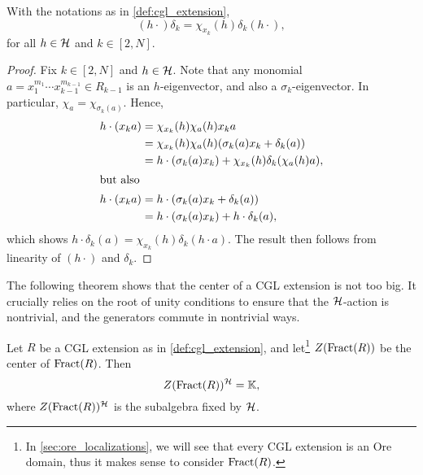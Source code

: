 \begin{lemma}\label{lem:h_after_delta}
	With the notations as in \cref{def:cgl_extension},
	\begin{equation*}
		(h\cdot )\delta_k = \chi_{x_k}(h)\delta_k(h\cdot),
	\end{equation*}
	for all $h \in \mathcal{H}$ and $k \in [2, N]$.
\end{lemma}
\begin{proof}
	Fix $k \in [2, N]$ and $h \in \mathcal{H}$. Note that any monomial $a = x_1^{m_1}\cdots x_{k-1}^{m_{k-1}} \in R_{k-1}$ is an $h$-eigenvector, and also a $\sigma_k$-eigenvector. In particular, $\chi_a = \chi_{\sigma_k(a)}$. Hence,
	\begin{align*}
		h \cdot(x_k a)  & = \chi_{x_k}(h)\chi_{a}(h)x_ka                                      \\
		                & = \chi_{x_k}(h)\chi_{a}(h)(\sigma_k (a)x_k +  \delta_k(a))          \\
		                & = h \cdot (\sigma_k (a) x_k) + \chi_{x_k}(h)\delta_k(\chi_{a}(h)a), \\
		\shortintertext{but also}
		h \cdot (x_k a) & = h \cdot (\sigma_k (a) x_k + \delta_k(a))                          \\
		                & = h \cdot (\sigma_k (a) x_k) + h\cdot \delta_k(a),
	\end{align*}
	which shows $h \cdot \delta_k (a) = \chi_{x_k}(h) \delta_k (h \cdot a)$. The result then follows from linearity of $(h \cdot)$ and $\delta_k$.
\end{proof}

The following theorem shows that the center of a CGL extension is not too big. It
crucially relies on the root of unity conditions to ensure that the $\mathcal{H}$-action is
nontrivial, and the generators commute in nontrivial ways.

\begin{theorem}\label{thm:H_rationality} Let $R$
	be a CGL extension as in \cref{def:cgl_extension}, and let\footnote{In
		\cref{sec:ore_localizations}, we will see that every CGL extension is an Ore domain,
		thus it makes sense to consider $\operatorname{Fract}(R)$.} $Z(\operatorname{Fract}(R))$ be the center of
	$\operatorname{Fract}(R)$. Then
	\begin{equation*}
		Z(\operatorname{Fract}(R))^{\mathcal{H}} = \mathbb{K},
	\end{equation*}
	where $Z(\operatorname{Fract}(R))^{\mathcal{H}}$ is the subalgebra fixed by $\mathcal{H}$.
\end{theorem}

